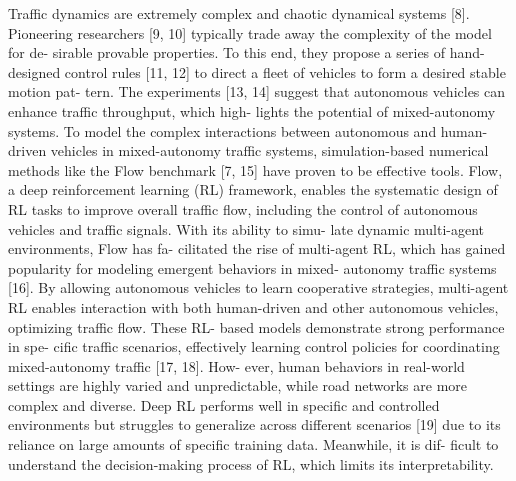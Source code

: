 \documentclass[12pt]{article}
\begin{document}
Traffic dynamics are extremely complex and chaotic
dynamical systems [8]. Pioneering researchers [9, 10]
typically trade away the complexity of the model for de-
sirable provable properties. To this end, they propose
a series of hand-designed control rules [11, 12] to direct
a fleet of vehicles to form a desired stable motion pat-
tern. The experiments [13, 14] suggest that autonomous
vehicles can enhance traffic throughput, which high-
lights the potential of mixed-autonomy systems. To
model the complex interactions between autonomous
and human-driven vehicles in mixed-autonomy traffic
systems, simulation-based numerical methods like the
Flow benchmark [7, 15] have proven to be effective tools.
Flow, a deep reinforcement learning (RL) framework,
enables the systematic design of RL tasks to improve
overall traffic flow, including the control of autonomous
vehicles and traffic signals. With its ability to simu-
late dynamic multi-agent environments, Flow has fa-
cilitated the rise of multi-agent RL, which has gained
popularity for modeling emergent behaviors in mixed-
autonomy traffic systems [16]. By allowing autonomous
vehicles to learn cooperative strategies, multi-agent RL
enables interaction with both human-driven and other
autonomous vehicles, optimizing traffic flow. These RL-
based models demonstrate strong performance in spe-
cific traffic scenarios, effectively learning control policies
for coordinating mixed-autonomy traffic [17, 18]. How-
ever, human behaviors in real-world settings are highly
varied and unpredictable, while road networks are more
complex and diverse. Deep RL performs well in specific
and controlled environments but struggles to generalize
across different scenarios [19] due to its reliance on large
amounts of specific training data. Meanwhile, it is dif-
ficult to understand the decision-making process of RL,
which limits its interpretability.
\end{document}
